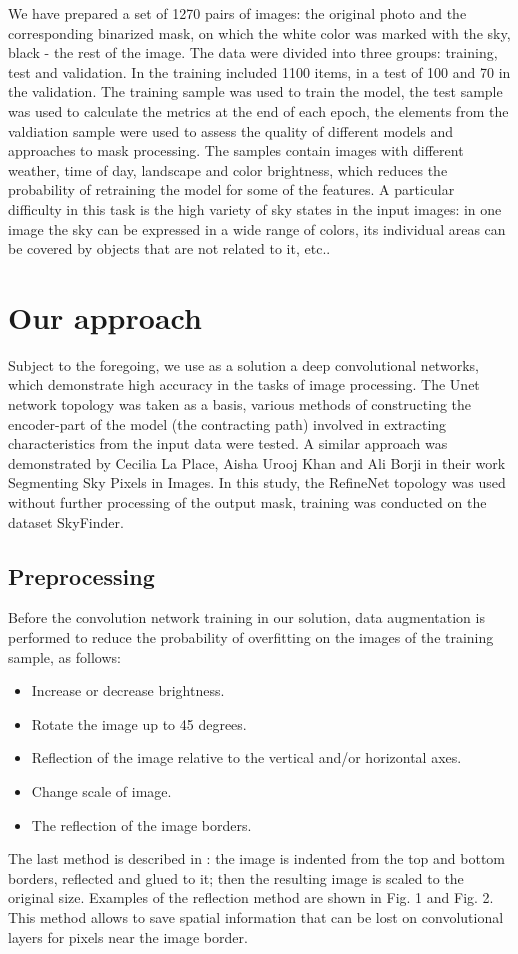 \documentclass[runningheads]{llncs}
\begin{document}
We have prepared a set of 1270 pairs of images: the original photo and the corresponding binarized mask, on which the white color was marked with the sky, black - the rest of the image. The data were divided into three groups: training, test and validation. In the training included 1100 items, in a test of 100 and 70 in the validation. The training sample was used to train the model, the test sample was used to calculate the metrics at the end of each epoch, the elements from the valdiation sample were used to assess the quality of different models and approaches to mask processing. The samples contain images with different weather, time of day, landscape and color brightness, which reduces the probability of retraining the model for some of the features. A particular difficulty in this task is the high variety of sky states in the input images: in one image the sky can be expressed in a wide range of colors, its individual areas can be covered by objects that are not related to it, etc..

\section{Our approach}
Subject to the foregoing, we use as a solution a deep convolutional networks, which demonstrate high accuracy in the tasks of image processing\cite{fcn}. The Unet network topology was taken as a basis, various methods of constructing the encoder-part of the model (the contracting path) involved in extracting characteristics from the input data were tested. A similar approach was demonstrated by Cecilia La Place, Aisha Urooj Khan and Ali Borji in their work Segmenting Sky Pixels in Images\cite{seg_sky}. In this study, the RefineNet topology was used without further processing of the output mask, training was conducted on the dataset SkyFinder\cite{sky_seg_wild}.

\subsection{Preprocessing}

Before the convolution network training in our solution, data augmentation is performed to reduce the probability of overfitting on the images of the training sample, as follows:
\begin{itemize}
\item Increase or decrease brightness.
\item Rotate the image up to 45 degrees.
\item Reflection of the image relative to the vertical and/or horizontal axes.
\item Change scale of image.
\item The reflection of the image borders.
\end{itemize}
The last method is described in \cite{unet}: the image is indented from the top and bottom borders, reflected and glued to it; then the resulting image is scaled to the original size. Examples of the reflection method are shown in Fig. 1 and Fig. 2. This method allows to save spatial information that can be lost on convolutional layers for pixels near the image border.
\end{document}
